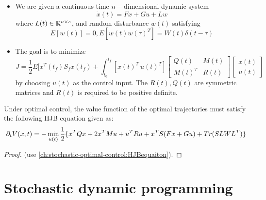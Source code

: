 \begin{refsection}
\begin{definition}\cite[421]{stengel2012optimal}\hfill
	\begin{itemize}
		\item We are given a continuous-time $n-$dimensional dynamic system
		$$\dot{x}(t)  =  Fx + Gu + Lw$$
		where $L(t)\in \mathbb{R}^{n\times s}$, and random disturbance $w(t)$ satisfying 
		$$E[w(t)] = 0, E[w(t)w(\tau)^T] = W(t)\delta(t-\tau)$$
		\item The goal is to minimize
		$$J = \frac{1}{2}E[x^T(t_f)S_fx(t_f) + \int_{t_0}^{t_f}[x(t)^T ~ u(t)^T]\begin{bmatrix}
		Q(t) & M(t)\\
		M(t)^T & R(t)
		\end{bmatrix} \begin{bmatrix}
		x(t)\\
		u(t)
		\end{bmatrix}$$
		by choosing $u(t)$ as the control input. The $R(t),Q(t)$ are symmetric matrices and $R(t)$ is required to be positive definite. 
	\end{itemize}
\end{definition}


\begin{theorem}
	Under optimal control, the value function of the optimal trajectories must satisfy the following HJB equation given as:
	$$\partial_t V(x,t) = -\min_{u(t)} \frac{1}{2}\{x^TQx + 2x^TMu + u^TRu + x^TS(Fx + Gu) + Tr(SLWL^T) \}$$ 
\end{theorem}
\begin{proof}
(use \autoref{ch:stochastic-optimal-control:HJBequaiton}).	
\end{proof}


\section{Stochastic dynamic programming}


\end{refsection}
